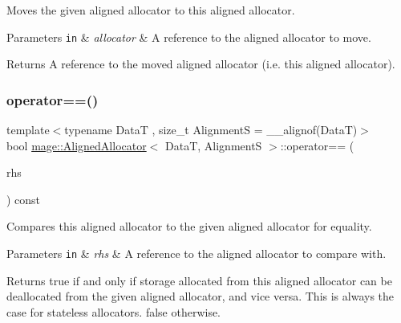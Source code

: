 Moves the given aligned allocator to this aligned allocator.


\begin{DoxyParams}[1]{Parameters}
\mbox{\tt in}  & {\em allocator} & A reference to the aligned allocator to move. \\
\hline
\end{DoxyParams}
\begin{DoxyReturn}{Returns}
A reference to the moved aligned allocator (i.\+e. this aligned allocator). 
\end{DoxyReturn}
\hypertarget{structmage_1_1_aligned_allocator_a3577dfd220aaf85e07ecd1770101a087}{}\label{structmage_1_1_aligned_allocator_a3577dfd220aaf85e07ecd1770101a087} 
\subsubsection{\texorpdfstring{operator==()}{operator==()}}
{\footnotesize\ttfamily template$<$typename DataT , size\+\_\+t AlignmentS = \+\_\+\+\_\+alignof(\+Data\+T)$>$ \\
bool \hyperlink{structmage_1_1_aligned_allocator}{mage\+::\+Aligned\+Allocator}$<$ DataT, AlignmentS $>$\+::operator== (\begin{DoxyParamCaption}\item[{const \hyperlink{structmage_1_1_aligned_allocator}{Aligned\+Allocator}$<$ DataT, AlignmentS $>$ \&}]{rhs }\end{DoxyParamCaption}) const\hspace{0.3cm}{\ttfamily [noexcept]}}

Compares this aligned allocator to the given aligned allocator for equality.


\begin{DoxyParams}[1]{Parameters}
\mbox{\tt in}  & {\em rhs} & A reference to the aligned allocator to compare with. \\
\hline
\end{DoxyParams}
\begin{DoxyReturn}{Returns}
{\ttfamily true} if and only if storage allocated from this aligned allocator can be deallocated from the given aligned allocator, and vice versa. This is always the case for stateless allocators. {\ttfamily false} otherwise. 
\end{DoxyReturn}
